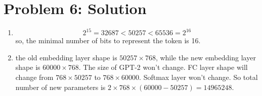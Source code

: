 \documentclass[12pt]{article}
\begin{document}
\section*{Problem 6: Solution}
\begin{enumerate}
	\item 
	\begin{equation}
	2^{15} = 32687 < 50257 < 65536 = 2^{16}
	\end{equation}
so, the minimal number of bits to represent the token is 16.
	
	
	\item
	
	the old embedding layer shape is $50257 \times 768$, while the new embedding layer shape is $60000 \times 768$. The size of GPT-2 won't change. FC layer shape will change from $768 \times 50257$ to $768 \times 60000$. Softmax layer won't change. So total number of new parameters is $2\times768\times(60000-50257) = 14965248$.
	
	
	
\end{enumerate}
\end{document}
